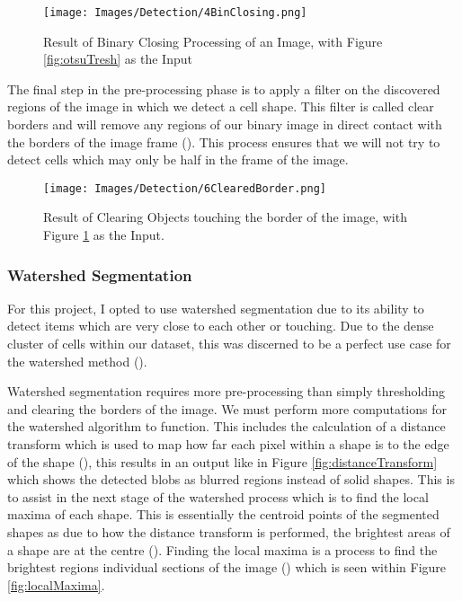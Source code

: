 \documentclass[12pt a4paper]{article}
\begin{document}
\begin{figure}
    \centering
    \texttt{[image: Images/Detection/4BinClosing.png]}
    \caption{Result of Binary Closing Processing of an Image, with Figure \ref{fig:otsuTresh} as the Input}
    \label{fig:bin_closing}
\end{figure}

The final step in the pre-processing phase is to apply a filter on the discovered regions of the image in which we detect a cell shape. This filter is called clear borders and will remove any regions of our binary image in direct contact with the borders of the image frame (\cite{clear}). This process ensures that we will not try to detect cells which may only be half in the frame of the image.
\begin{figure}
    \centering
    \texttt{[image: Images/Detection/6ClearedBorder.png]}
    \caption{Result of Clearing Objects touching the border of the image, with Figure \ref{fig:bin_closing} as the Input.}
    \label{fig:clearBorder}
\end{figure}

\subsubsection{Watershed Segmentation}
For this project, I opted to use watershed segmentation due to its ability to detect items which are very close to each other or touching. Due to the dense cluster of cells within our dataset, this was discerned to be a perfect use case for the watershed method (\cite{matlab&simulink}).

Watershed segmentation requires more pre-processing than simply thresholding and clearing the borders of the image. We must perform more computations for the watershed algorithm to function. This includes the calculation of a distance transform which is used to map how far each pixel within a shape is to the edge of the shape (\cite{rao2002modification}), this results in an output like in Figure \ref{fig:distanceTransform} which shows the detected blobs as blurred regions instead of solid shapes. This is to assist in the next stage of the watershed process which is to find the local maxima of each shape. This is essentially the centroid points of the segmented shapes as due to how the distance transform is performed, the brightest areas of a shape are at the centre (\cite{rao2002modification}). Finding the local maxima is a process to find the brightest regions individual sections of the image (\cite{gauch1999image}) which is seen within Figure \ref{fig:localMaxima}. 
\end{document}
